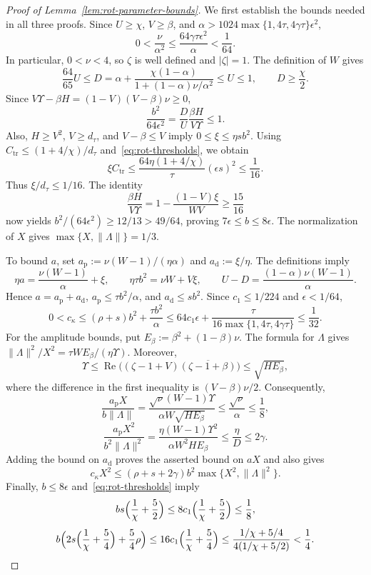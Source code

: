 \begin{proof}[Proof of Lemma~\ref{lem:rot-parameter-bounds}]
We first establish the bounds needed in all three proofs. Since
\(U\ge\chi\), \(V\ge\beta\), and
\(\alpha>1024\max\{1,4\tau,4\gamma\tau\}\epsilon^2\),
\[
0<\frac\nu{\alpha^2}
\le\frac{64\gamma\tau\epsilon^2}{\alpha}<\frac1{64}.
\]
In particular, \(0<\nu<4\), so \(\zeta\) is well defined and
\(|\zeta|=1\). The definition of \(W\) gives
\[
\frac{64}{65}U\le
D=\alpha+\frac{\chi(1-\alpha)}{1+(1-\alpha)\nu/\alpha^2}
\le U\le1,
\qquad D\ge\frac\chi2.
\]
Since \(V\Upsilon-\beta H=(1-V)(V-\beta)\nu\ge0\),
\[
\frac{b^2}{64\epsilon^2}=\frac D U\frac{\beta H}{V\Upsilon}\le1.
\]
Also, \(H\ge V^2\), \(V\ge d_\tau\), and \(V-\beta\le V\) imply
\(0\le\xi\le\eta s b^2\). Using
\(C_\mathrm{tr}\le(1+4/\chi)/d_\tau\) and~\eqref{eq:rot-thresholds}, we obtain
\begin{equation}
\label{eq:rot-small-feedback}
\xi C_\mathrm{tr}
\le\frac{64\eta(1+4/\chi)}\tau(\epsilon s)^2
\le\frac1{16}.
\end{equation}
Thus \(\xi/d_\tau\le1/16\). The identity
\[
\frac{\beta H}{V\Upsilon}
=1-\frac{(1-V)\xi}{WV}\ge\frac{15}{16}
\]
now yields \(b^2/(64\epsilon^2)\ge12/13>49/64\), proving
\(7\epsilon\le b\le8\epsilon\).
The normalization of \(X\) gives \(\max\{X,\|\Lambda\|\}=1/3\).

To bound \(a\), set
\(a_\mathrm{p}:=\nu(W-1)/(\eta\alpha)\) and \(a_\mathrm{d}:=\xi/\eta\).
The definitions imply
\begin{equation}
\label{eq:rot-algebra-identities}
\eta a=\frac{\nu(W-1)}\alpha+\xi,
\qquad \eta\tau b^2=\nu W+V\xi,
\qquad U-D=\frac{(1-\alpha)\nu(W-1)}\alpha.
\end{equation}
Hence \(a=a_\mathrm{p}+a_\mathrm{d}\),
\(a_\mathrm{p}\le\tau b^2/\alpha\), and \(a_\mathrm{d}\le sb^2\).
Since \(c_1\le1/224\) and \(\epsilon<1/64\),
\[
0<c_\kappa\le(\rho+s)b^2+\frac{\tau b^2}\alpha
\le64c_1\epsilon+\frac{\tau}{16\max\{1,4\tau,4\gamma\tau\}}
\le\frac1{32}.
\]
For the amplitude bounds, put \(E_\beta:=\beta^2+(1-\beta)\nu\).
The formula for \(\Lambda\) gives
\(\|\Lambda\|^2/X^2=\tau WE_\beta/(\eta\Upsilon)\).
Moreover,
\[
\Upsilon\le
\operatorname{Re}\bigl((\zeta-1+V)\overline{(\zeta-1+\beta)}\bigr)
\le\sqrt{HE_\beta},
\]
where the difference in the first inequality is \((V-\beta)\nu/2\).
Consequently,
\[
\frac{a_\mathrm{p}X}{b\|\Lambda\|}
=\frac{\sqrt\nu(W-1)\Upsilon}{\alpha W\sqrt{HE_\beta}}
\le\frac{\sqrt\nu}\alpha\le\frac18,
\]
\[
\frac{a_\mathrm{p}X^2}{b^2\|\Lambda\|^2}
=\frac{\eta(W-1)\Upsilon^2}{\alpha W^2HE_\beta}
\le\frac\eta D\le2\gamma.
\]
Adding the bound on \(a_\mathrm{d}\) proves the asserted bound on \(aX\)
and also gives
\[
c_\kappa X^2\le(\rho+s+2\gamma)b^2\max\{X^2,\|\Lambda\|^2\}.
\]
Finally, \(b\le8\epsilon\) and~\eqref{eq:rot-thresholds} imply
\[
bs\Bigl(\frac1\chi+\frac52\Bigr)
\le8c_1\Bigl(\frac1\chi+\frac52\Bigr)\le\frac18,
\]
\[
b\Bigl(2s\Bigl(\frac1\chi+\frac54\Bigr)+\frac54\rho\Bigr)
\le16c_1\Bigl(\frac1\chi+\frac54\Bigr)
\le\frac{1/\chi+5/4}{4(1/\chi+5/2)}<\frac14.
\]
\end{proof}

